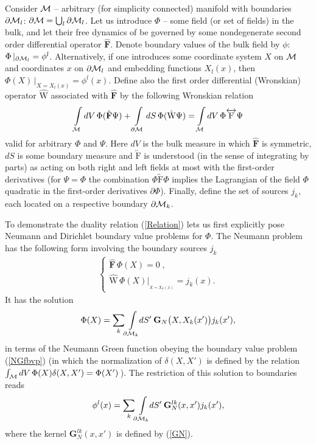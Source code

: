 \documentclass[a4paper,12pt]{article}
\newcommand{\M}{{\cal M}}
\newcommand{\dM}{{\partial \cal M}}
\newcommand{\dV}{dV}
\newcommand{\dS}{dS}
\newcommand{\BBox}{\hat{\mathbf{F}}}  %
\newcommand{\GrN}{\mathbf{G}_{N}}
\begin{document}
Consider $\M$ -- arbitrary (for simplicity connected) manifold
with boundaries $\dM_l$: $\dM=\bigcup_l\dM_l$. Let us introduce
$\Phi$ -- some field (or set of fields) in the bulk, and let their
free dynamics of be governed by some nondegenerate second order
differential operator $\BBox $. Denote boundary values of the bulk
field by $\phi$: $\Phi\,|_{\dM_l}=\phi^l$. Alternatively, if one
introduces some coordinate system $X$ on $\M$ and coordinates $x$
on $\dM_l$ and embedding functions $X_l(x)$, then
$\Phi(X)\,|_{X=X_l(x)}=\phi^l(x)$. Define also the first order
differential (Wronskian) operator $\hat{\mathrm{W}}$ associated
with $\BBox$ by the following Wronskian relation
    \begin{eqnarray}
     \int\limits_{\M} \dV\, \Phi(\BBox \Psi)+
     \int\limits_{\dM}\dS\, \Phi(\hat{\mathrm{W}}\Psi)=
     \int\limits_{\M} \dV\, \Phi
     {{\overleftrightarrow{\mathrm{F}}}}\Psi
    \end{eqnarray}
valid for arbitrary $\Phi$ and $\Psi$. Here $\dV$ is the bulk
measure in which $\BBox$ is symmetric, $\dS$ is some boundary
measure and ${{\overleftrightarrow{\mathrm{F}}}}$ is understood
(in the sense of integrating by parts) as acting on both right and
left fields at most with the first-order derivatives (for
$\Psi=\Phi$ the combination
$\Phi{{\overleftrightarrow{\mathrm{F}}}}\Phi$ implies the
Lagrangian of the field $\Phi$ quadratic in the first-order
derivatives $\partial\Phi$). Finally, define the set of sources
$j_k$, each located on a respective boundary $\dM_k$.

To demonstrate the duality relation (\ref{Relation}) lets us first
explicitly pose Neumann and Dirichlet boundary value problems for $\Phi$.
The Neumann problem has the following form involving the boundary
sources $j_k$
    \begin{eqnarray}
     \left\{ \begin{array}{l}
     \BBox \,\Phi(X)=0\;, \\
     \hat{\mathrm{W}} \,\Phi(X) \big|_{_{X=X_k(x)}}\!\!\!=j_k(x).
     \end{array} \right.                      \label{Nbvp}
    \end{eqnarray}
It has the solution
    \begin{eqnarray}
     \Phi(X)=\sum_k\!\int \limits_{\dM_k}\!\!\dS'\:
     \GrN\big(X,X_k(x')\big)
     j_k(x'),                     \label{NGenSol}
    \end{eqnarray}
in terms of the Neumann Green function obeying the boundary value
problem (\ref{NGfbvp}) (in which the normalization of
$\delta(X,X')$ is defined by the relation $\int_{\M} \dV\,
\Phi(X)\delta(X,X')=\Phi(X')\,$). The restriction of this solution
to boundaries reads
    \begin{eqnarray}
      \phi^l(x)=\sum_k\!\int \limits_{\dM_k}\!\!\dS'\:
      {\mathbf G}_N^{lk}(x,x')j_k(x'),       \label{N}
    \end{eqnarray}
where the kernel ${\mathbf G}_N^{lk}(x,x')$ is defined
by (\ref{GN}).
\end{document}
